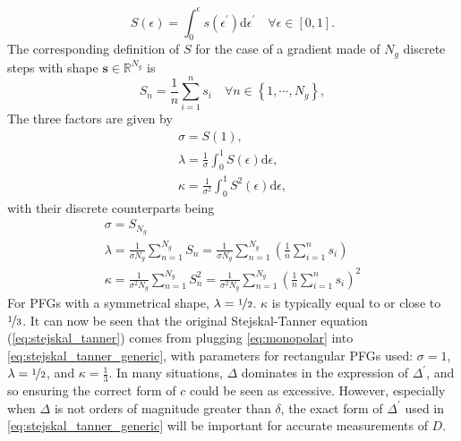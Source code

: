 \begin{equation}
    S(\epsilon) = \int_0^{\epsilon} s\left(\epsilon^{\prime}\right)
            \mathrm{d} \epsilon^{\prime} \quad \forall \epsilon \in [0, 1].
\end{equation}
The corresponding definition of $S$ for the case of a gradient made of $N_g$
discrete steps with shape $\symbf{s} \in \mathbb{R}^{N_g}$ is
\begin{equation}
    S_n =
        \frac{1}{n} \sum_{i = 1}^{n} s_i \quad
        \forall n \in \left\lbrace 1, \cdots, N_g\right\rbrace,
\end{equation}
The three factors are given by
\begin{subequations}
    \begin{gather}
        \sigma = S(1),\\
        \lambda = \frac{1}{\sigma} \int_0^1 S(\epsilon) \mathrm{d} \epsilon,\\
        \kappa = \frac{1}{\sigma^2} \int_0^1 S^2(\epsilon) \mathrm{d} \epsilon,
    \end{gather}
\end{subequations}
with their discrete counterparts being
\begin{subequations}
    \begin{gather}
        \sigma = S_{N_g} \\
        \lambda = \frac{1}{\sigma N_g} \sum_{n = 1}^{N_g} S_n
            = \frac{1}{\sigma N_g} \sum_{n=1}^{N_g}
            \left(\frac{1}{n} \sum_{i=1}^{n} s_i\right) \\
        \kappa = \frac{1}{\sigma^2 N_g} \sum_{n = 1}^{N_g} S^2_n
            = \frac{1}{\sigma^2 N_g} \sum_{n = 1}^{N_g}
            \left(\frac{1}{n} \sum_{i=1}^{n} s_i\right)^2
    \end{gather}
\end{subequations}
For \acp{PFG} with a symmetrical shape, $\lambda = \nicefrac{1}{2}$. $\kappa$
is typically equal to or close to $\nicefrac{1}{3}$. It can now be seen that
the original Stejskal-Tanner equation (\cref{eq:stejskal_tanner}) comes from
plugging \cref{eq:monopolar} into \cref{eq:stejskal_tanner_generic}, with
parameters for rectangular \acp{PFG} used: $\sigma = 1$,  $\lambda =
\nicefrac{1}{2}$, and  $\kappa = \frac{1}{3}$. In many situations,  $\Delta$
dominates in the expression of $\Delta^{\prime}$, and so ensuring the correct
form of $c$ could be seen as excessive. However, especially when  $\Delta$ is
not orders of magnitude greater than $\delta$, the exact form of
$\Delta^{\prime}$ used in \cref{eq:stejskal_tanner_generic} will be
important for accurate measurements of $D$.

